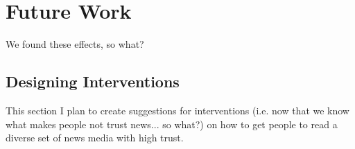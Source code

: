 \chapter{Future Work}
We found these effects, so what?
 
\section{Designing Interventions}
This section I plan to create suggestions for interventions (i.e. now that we know what makes people not trust news... so what?) on how to get people to read a diverse set of news media with high trust.